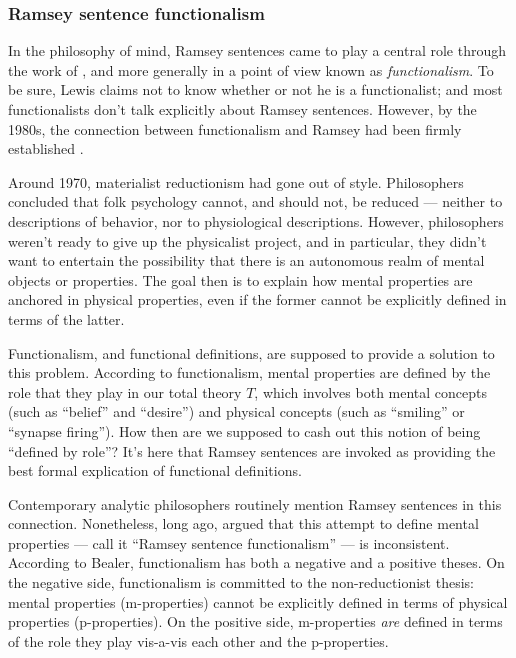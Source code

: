 \subsubsection*{Ramsey sentence functionalism}

In the philosophy of mind, Ramsey sentences came to play a central
role through the work of \cite{lewis-id,lewis-psy,lewis1994}, and more
generally in a point of view known as \emph{functionalism}.  To be
sure, Lewis claims not to know whether or not he is a functionalist;
and most functionalists don't talk explicitly about Ramsey sentences.
However, by the 1980s, the connection between functionalism and Ramsey
had been firmly established \cite[see][]{shoemaker}.

Around 1970, materialist reductionism had gone out of style.
Philosophers concluded that folk psychology cannot, and should not, be
reduced --- neither to descriptions of behavior, nor to physiological
descriptions.  However, philosophers weren't ready to give up the
physicalist project, and in particular, they didn't want to entertain
the possibility that there is an autonomous realm of mental objects or
properties.  The goal then is to explain how mental properties are
anchored in physical properties, even if the former cannot be
explicitly defined in terms of the latter.

Functionalism, and functional definitions, are supposed to provide a
solution to this problem.  According to functionalism, mental
properties are defined by the role that they play in our total theory
$T$, which involves both mental concepts (such as ``belief'' and
``desire'') and physical concepts (such as ``smiling'' or ``synapse
firing'').  How then are we supposed to cash out this notion of being
``defined by role''?  It's here that Ramsey sentences are invoked as
providing the best formal explication of functional definitions.

Contemporary analytic philosophers routinely mention Ramsey sentences
in this connection.  Nonetheless, long ago, \cite{bealer} argued that
this attempt to define mental properties --- call it ``Ramsey sentence
functionalism'' --- is inconsistent.  According to Bealer,
functionalism has both a negative and a positive theses.  On the
negative side, functionalism is committed to the non-reductionist
thesis: mental properties (m-properties) cannot be explicitly defined
in terms of physical properties (p-properties).  On the positive side,
m-properties {\it are} defined in terms of the role they play
vis-a-vis each other and the p-properties.

